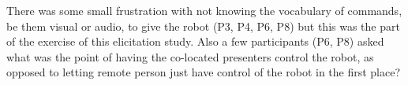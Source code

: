 \documentclass{tufte-handout}
\begin{document}
There was some small frustration with not knowing the vocabulary of
commands, be them visual or audio, to give the robot (P3, P4, P6, P8)
but this was the part of the exercise of this elicitation study.  Also
a few participants (P6, P8) asked what was the point of having the
co-located presenters control the robot, as opposed to letting remote
person just have control of the robot in the first place?





\end{document}
